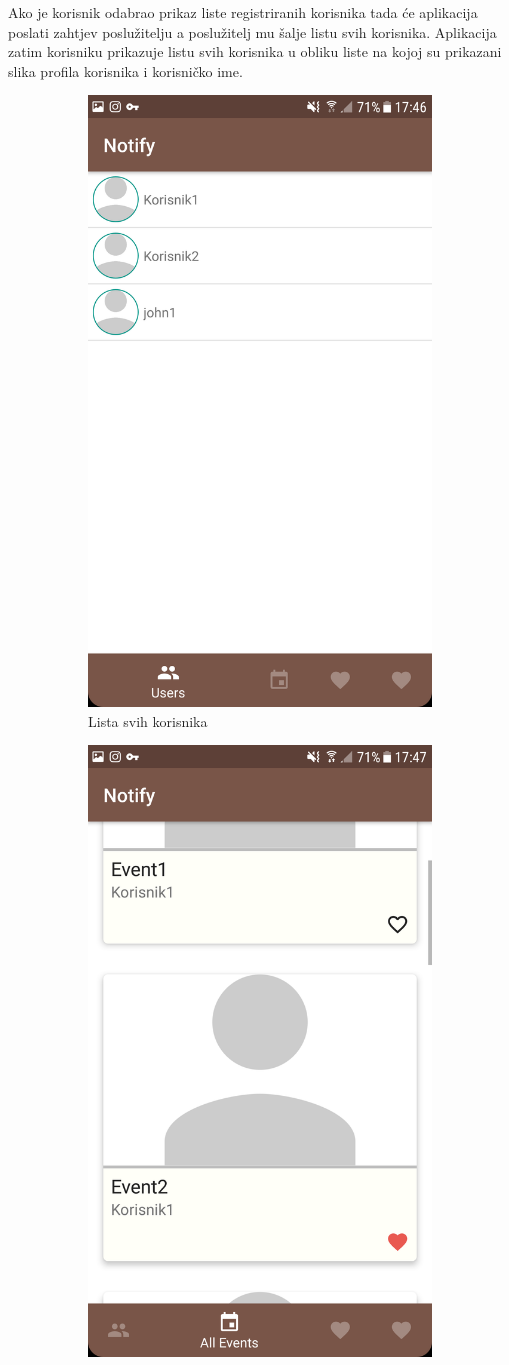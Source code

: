 \documentclass[times, utf8, zavrsni]{fer}
\begin{document}
Ako je korisnik odabrao prikaz liste registriranih korisnika tada će aplikacija poslati zahtjev poslužitelju a poslužitelj mu šalje listu svih korisnika. Aplikacija zatim korisniku prikazuje listu svih korisnika u obliku liste na kojoj su prikazani slika profila korisnika i korisničko ime.

\begin{figure}
\centering

\begin{subfigure}{0.5\linewidth}
	\centering
    \includegraphics[width=0.45\linewidth]{img/ss-user-list.png} 
    \caption{Lista svih korisnika}
    \label{fig:user-list-image}
\end{subfigure}%
\begin{subfigure}{0.5\linewidth}
 	\centering
    \includegraphics[width=0.45\linewidth]{img/ss-event-list-all.png} 

\end{subfigure}
\end{figure}
\end{document}
